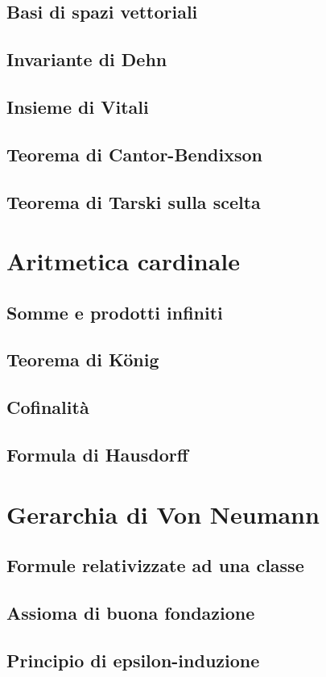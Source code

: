 \documentclass[11pt]{scrartcl}
\begin{document}
\subsection{Basi di spazi vettoriali}
\newpage
\subsection{Invariante di Dehn}
\newpage
\subsection{Insieme di Vitali}
\newpage
\subsection{Teorema di Cantor-Bendixson}
\newpage
\subsection{Teorema di Tarski sulla scelta}









\newpage
\section{Aritmetica cardinale}
\subsection{Somme e prodotti infiniti}
\newpage
\subsection{Teorema di König}
\newpage
\subsection{Cofinalità}
\newpage
\subsection{Formula di Hausdorff}






\newpage
\section{Gerarchia di Von Neumann}
\subsection{Formule relativizzate ad una classe}
\newpage
\subsection{Assioma di buona fondazione}
\newpage
\subsection{Principio di epsilon-induzione}
\end{document}
